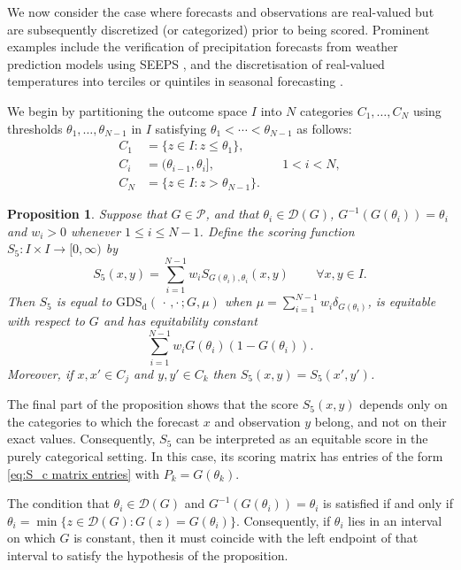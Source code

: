 \documentclass[10pt]{article} %
\theoremstyle{theorem}
\newtheorem{prop}{Proposition}
\theoremstyle{definition}
\newcommand{\GDSd}{\mathrm{GDS}_\mathrm{d}}
\newcommand{\twocdots}{\,\cdot\,,\cdot\,}
\begin{document}
We now consider the case where forecasts and observations are real-valued but are subsequently discretized (or categorized) prior to being scored. Prominent examples include the verification of precipitation forecasts from weather prediction models using SEEPS \citep{rodwell2010new}, and the discretisation of real-valued temperatures into terciles or quintiles in seasonal forecasting \citep{barnston1992correspondence, potts1996revised}.

We begin by partitioning the outcome space $I$ into $N$ categories $C_1,\ldots,C_N$ using thresholds $\theta_1,\ldots,\theta_{N-1}$ in $I$ satisfying $\theta_1<\cdots<\theta_{N-1}$ as follows:
\begin{align*}
C_1&=\{z\in I:z\leq \theta_1\}, \quad & \\
C_i&=(\theta_{i-1},\theta_i], \quad & 1<i<N, \\
C_N&=\{z\in I:z>\theta_{N-1}\}. \quad &
\end{align*}

\begin{prop}\label{prop:equitable discretize}
Suppose that $G\in\mathcal{P}$, and that $\theta_i\in \mathcal{D}(G)$, $G^{-1}(G(\theta_i))=\theta_i$ and $w_i>0$ whenever $1\leq i \leq N-1$. Define the scoring function $S_5:I \times I\to[0,\infty)$ by
\begin{equation}\label{eq:equitable discretize}
S_5(x,y)=\sum_{i=1}^{N-1}w_i S_{G(\theta_i), \theta_i}(x,y)\,\qquad \forall x,y\in I.
\end{equation}
Then $S_5$ is equal to $\GDSd(\twocdots; G, \mu)$ when $\mu=\sum_{i=1}^{N-1}w_i\delta_{G(\theta_i)}$, is equitable with respect to $G$ and has equitability constant
\begin{equation}
\sum_{i=1}^{N-1} w_i G(\theta_i)(1-G(\theta_i)).
\end{equation}
Moreover, if $x,x'\in C_j$ and $y,y'\in C_k$ then $S_5(x,y)=S_5(x',y')$.
\end{prop}

The final part of the proposition shows that the score $S_5(x,y)$ depends only on the categories to which the forecast $x$ and observation $y$ belong, and not on their exact values. Consequently, $S_5$ can be interpreted as an equitable score in the purely categorical setting. In this case, its scoring matrix has entries of the form \eqref{eq:S_c matrix entries} with $P_k = G(\theta_k)$. 

The condition that $\theta_i \in \mathcal{D}(G)$ and $G^{-1}(G(\theta_i))=\theta_i$ is satisfied if and only if $\theta_i = \min\{ z \in \mathcal{D}(G) : G(z) = G(\theta_i) \}$. Consequently, if $\theta_i$ lies in an interval on which $G$ is constant, then it must coincide with the left endpoint of that interval to satisfy the hypothesis of the proposition.
\end{document}
